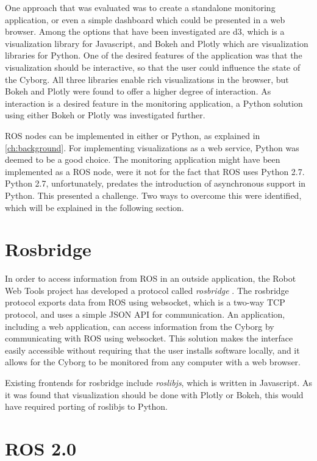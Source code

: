 \documentclass[\rootfolder/main.tex]{subfiles}
\begin{document}
One approach that was evaluated was to create a standalone monitoring application, or even a simple dashboard which could be presented in a web browser.
Among the options that have been investigated are d3, which is a visualization library for Javascript, and Bokeh and Plotly which are visualization libraries for Python.
One of the desired features of the application was that the visualization should be interactive, so that the user could influence the state of the Cyborg.
All three libraries enable rich visualizations in the browser, but Bokeh and Plotly were found to offer a higher degree of interaction.
As interaction is a desired feature in the monitoring application, a Python solution using either Bokeh or Plotly was investigated further.

ROS nodes can be implemented in either \CC or Python, as explained in \cref{ch:background}.
For implementing visualizations as a web service, Python was deemed to be a good choice.
The monitoring application might have been implemented as a ROS node, were it not for the fact that ROS uses Python 2.7. Python 2.7, unfortunately, predates the introduction of asynchronous support in Python.
This presented a challenge.
Two ways to overcome this were identified, which will be explained in the following section.

\section{Rosbridge}

In order to access information from ROS in an outside application, the Robot Web Tools project has developed a protocol called \emph{rosbridge} \cite{Toris}.
The rosbridge protocol exports data from ROS using websocket, which is a two-way TCP protocol, and uses a simple JSON API for communication.
An application, including a web application, can access information from the Cyborg by communicating with ROS using websocket.
This solution makes the interface easily accessible without requiring that the user installs software locally, and it allows for the Cyborg to be monitored from any computer with a web browser.

Existing frontends for rosbridge include \emph{roslibjs}, which is written in Javascript.
As it was found that visualization should be done with Plotly or Bokeh, this would have required porting of roslibjs to Python.

\section{ROS 2.0}
\end{document}
